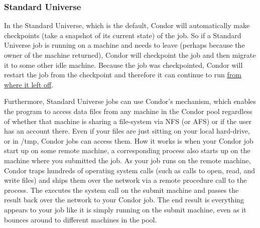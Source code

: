 \subsubsection{\label{sec:standard-universe}Standard Universe}

In the Standard Universe, which is the default, Condor will
automatically make checkpoints (take a snapshot of its current state) of
the job. So if a Standard Universe job is running on a machine and needs
to leave (perhaps because the owner of the machine returned), Condor
will checkpoint the job and then migrate it to some other idle machine.
Because the job was checkpointed, Condor will restart the job from the
checkpoint and therefore it can continue to run \underline{from where it
left off}. 

Furthermore, Standard Universe jobs can use Condor's  mechanism, which enables the program to access data files from
any machine in the Condor pool regardless of whether that machine is
sharing a file-system via NFS (or AFS) or if the user has an account
there. Even if your files are just sitting on your local hard-drive, or
in /tmp, Condor jobs can access them.  How it works is when your Condor
job start up on some remote machine, a corresponding 
process also starts up on the machine where you submitted the job.
As your job runs on the remote machine, Condor traps hundreds of operating system 
calls (such as calls to open, read, and
write files) and ships them over the network via a remote procedure call
to the  process.  The  executes the system
call on the submit machine and passes the result back over the network
to your Condor job.  The end result is everything appears to your job
like it is simply running on the submit machine, even as it bounces
around to different machines in the pool.

